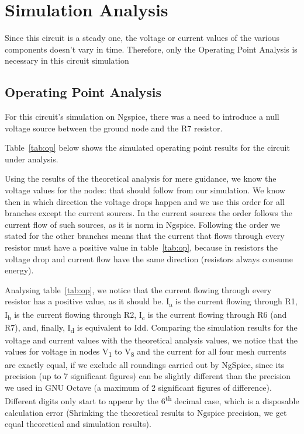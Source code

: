 \section{Simulation Analysis}
\label{sec:simulation}

Since this circuit is a steady one, the voltage or current values of the various components doesn't vary in time. Therefore, only the Operating Point Analysis is necessary in this circuit simulation

\subsection{Operating Point Analysis}


For this circuit's simulation on Ngspice, there was a need to introduce a null voltage source between the ground node and the R7 resistor.

Table~\ref{tab:op} below shows the simulated operating point results for the circuit
under analysis.

Using the results of the theoretical analysis for mere guidance, we know the voltage values for the nodes: that should follow from our simulation. We know then in which direction the voltage drops happen and we use this order for all branches except the current sources. In the current sources the order follows the current flow of such sources, as it is norm in Ngspice. Following the order we stated for the other branches means that the current that flows through every resistor must have a positive value in table~\ref{tab:op}, because in resistors the voltage drop and current flow have the same direction (resistors always consume energy).

Analysing table~\ref{tab:op}, we notice that the current flowing through every resistor has a positive value, as it should be. I\textsubscript{a} is the current flowing through R1, I\textsubscript{b} is the current flowing through R2, I\textsubscript{c} is the current flowing through R6 (and R7), and, finally, I\textsubscript{d} is equivalent to Idd.
Comparing the simulation results for the voltage and current values with the theoretical analysis values, we notice that the values for voltage in nodes V\textsubscript{1} to V\textsubscript{8} and the current for all four mesh currents are exactly equal, if we exclude all roundings carried out by NgSpice, since its precision (up to 7 significant figures) can be slightly different than the precision we used in GNU Octave (a maximum of 2 significant figures of difference). Different digits only start to appear by the 6\textsuperscript{th} decimal case, which is a disposable calculation error (Shrinking the theoretical results to Ngspice precision, we get equal theoretical and simulation results).

